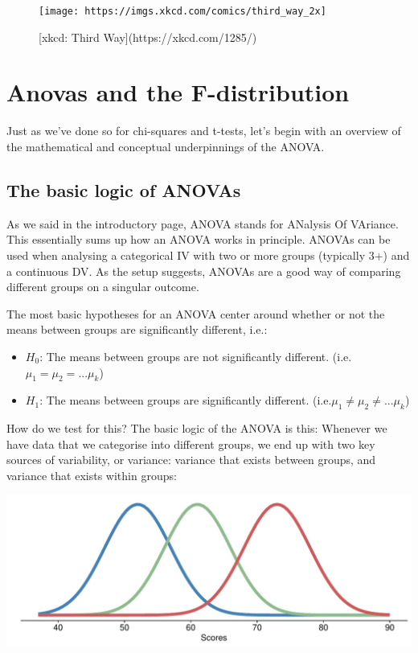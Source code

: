 \documentclass[
]{book}
\providecommand{\tightlist}{%
  \setlength{\itemsep}{0pt}\setlength{\parskip}{0pt}}
\begin{document}
\begin{figure}

{\centering \texttt{[image: https://imgs.xkcd.com/comics/third\_way\_2x]} 

}

\caption{[xkcd: Third Way](https://xkcd.com/1285/)}\label{fig:unnamed-chunk-150}
\end{figure}

\hypertarget{anovas-and-the-f-distribution}{%
\section{Anovas and the F-distribution}\label{anovas-and-the-f-distribution}}

Just as we've done so for chi-squares and t-tests, let's begin with an
overview of the mathematical and conceptual underpinnings of the ANOVA.

\hypertarget{the-basic-logic-of-anovas}{%
\subsection{The basic logic of ANOVAs}\label{the-basic-logic-of-anovas}}

As we said in the introductory page, ANOVA stands for ANalysis Of VAriance. This essentially sums up how an ANOVA works in principle. ANOVAs can be used when analysing a categorical IV with two or more groups (typically 3+) and a continuous DV. As the setup suggests, ANOVAs are a good way of comparing different groups on a singular outcome.

The most basic hypotheses for an ANOVA center around whether or not the
means between groups are significantly different, i.e.:

\begin{itemize}
\tightlist
\item
  \(H_0\): The means between groups are not significantly different.
  (i.e.~\(\mu_1 = \mu_2 = ... \mu_k\))
\item
  \(H_1\): The means between groups are significantly different.
  (i.e.\(\mu_1 \neq \mu_2 \neq ... \mu_k\))
\end{itemize}

How do we test for this? The basic logic of the ANOVA is this: Whenever
we have data that we categorise into different groups, we end up with
two key sources of variability, or variance: variance that exists
between groups, and variance that exists within groups:

\includegraphics{_main_files/figure-latex/unnamed-chunk-151-1.pdf}
\end{document}
